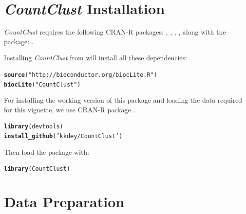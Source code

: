 \documentclass[12pt]{article}\usepackage[]{graphicx}\usepackage[usenames,dvipsnames]{color}
\makeatletter
\newcommand{\hlstr}[1]{\textcolor[rgb]{0.192,0.494,0.8}{#1}}%
\newcommand{\hlstd}[1]{\textcolor[rgb]{0.345,0.345,0.345}{#1}}%
\newcommand{\hlkwd}[1]{\textcolor[rgb]{0.737,0.353,0.396}{\textbf{#1}}}%
\newenvironment{kframe}{%
 \def\at@end@of@kframe{}%
 \ifinner\ifhmode%
  \def\at@end@of@kframe{\end{minipage}}%
  \begin{minipage}{\columnwidth}%
 \fi\fi%
 \def\FrameCommand##1{\hskip\@totalleftmargin \hskip-\fboxsep
 \colorbox{shadecolor}{##1}\hskip-\fboxsep
     \hskip-\linewidth \hskip-\@totalleftmargin \hskip\columnwidth}%
 \MakeFramed {\advance\hsize-\width
   \@totalleftmargin\z@ \linewidth\hsize
   \@setminipage}}%
 {\par\unskip\endMakeFramed%
 \at@end@of@kframe}
\newenvironment{knitrout}{}{} %
\newcommand{\CountClust}{\textit{CountClust}}
\makeatother
\begin{document}
\section{\CountClust{} Installation}

\CountClust{} requires the following CRAN-R packages: , ,  , , along with the \Bioconductor{} package: .

Installing \CountClust{} from \Bioconductor{} will install all these dependencies:

\begin{knitrout}
\color{fgcolor}\begin{kframe}
\begin{alltt}
\hlkwd{source}\hlstd{(}\hlstr{"http://bioconductor.org/biocLite.R"}\hlstd{)}
\hlkwd{biocLite}\hlstd{(}\hlstr{"CountClust"}\hlstd{)}
\end{alltt}
\end{kframe}
\end{knitrout}

For installing the working version of this package and loading the data required for this vignette, we use CRAN-R package .

\begin{knitrout}
\color{fgcolor}\begin{kframe}
\begin{alltt}
\hlkwd{library}\hlstd{(devtools)}
\hlkwd{install_github}\hlstd{(}\hlstr{'kkdey/CountClust'}\hlstd{)}
\end{alltt}
\end{kframe}
\end{knitrout}

Then load the package with:

\begin{knitrout}
\color{fgcolor}\begin{kframe}
\begin{alltt}
\hlkwd{library}\hlstd{(CountClust)}
\end{alltt}
\end{kframe}
\end{knitrout}

\section{Data Preparation}
\end{document}
